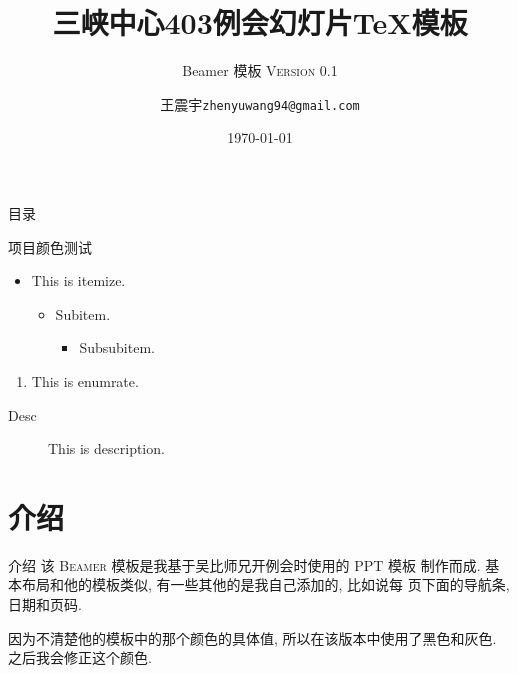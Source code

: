 \documentclass[no-math]{beamer}
\title{三峡中心403例会幻灯片\TeX{}模板}
\subtitle{\LaTeXe{} Beamer 模板 \textsc{Version 0.1}}
\date{\today}
\author{王震宇\quad \texttt{zhenyuwang94@gmail.com}}
\institute{计算机学院}
\begin{document}
    \begin{frame}
        \titlepage
    \end{frame}
    \begin{frame}{目录}
        \tableofcontents
    \end{frame}
    \begin{frame}{项目颜色测试}
        \begin{itemize}
            \item This is itemize.
                \begin{itemize}
                    \item Subitem.
                        \begin{itemize}
                            \item Subsubitem.
                        \end{itemize}
                \end{itemize}
        \end{itemize}
        \begin{enumerate}
            \item This is enumrate.
        \end{enumerate}
        \begin{description}
            \item[Desc] This is description. 
        \end{description}
    \end{frame}
    
    \section{介绍}
    \begin{frame}{介绍}
        该 \LaTeXe{} \textsc{Beamer} 模板是我基于吴比师兄开例会时使用的 PPT 模板
        制作而成. 基本布局和他的模板类似, 有一些其他的是我自己添加的, 比如说每
        页下面的导航条, 日期和页码.

        因为不清楚他的模板中的那个颜色的具体值, 所以在该版本中使用了黑色和灰色.
        之后我会修正这个颜色.
    \end{frame}
\end{document}
